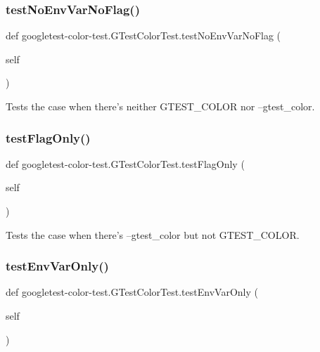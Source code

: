 \subsubsection{\texorpdfstring{test\+No\+Env\+Var\+No\+Flag()}{testNoEnvVarNoFlag()}}
{\footnotesize\ttfamily def googletest-\/color-\/test.\+G\+Test\+Color\+Test.\+test\+No\+Env\+Var\+No\+Flag (\begin{DoxyParamCaption}\item[{}]{self }\end{DoxyParamCaption})}

\begin{DoxyVerb}Tests the case when there's neither GTEST_COLOR nor --gtest_color.\end{DoxyVerb}
 \mbox{\label{classgoogletest-color-test_1_1_g_test_color_test_ade41e99b5486c9d947d9b817210174f6}} 
\subsubsection{\texorpdfstring{test\+Flag\+Only()}{testFlagOnly()}}
{\footnotesize\ttfamily def googletest-\/color-\/test.\+G\+Test\+Color\+Test.\+test\+Flag\+Only (\begin{DoxyParamCaption}\item[{}]{self }\end{DoxyParamCaption})}

\begin{DoxyVerb}Tests the case when there's --gtest_color but not GTEST_COLOR.\end{DoxyVerb}
 \mbox{\label{classgoogletest-color-test_1_1_g_test_color_test_a1f0a2bab46c123e865a821307bd689de}} 
\subsubsection{\texorpdfstring{test\+Env\+Var\+Only()}{testEnvVarOnly()}}
{\footnotesize\ttfamily def googletest-\/color-\/test.\+G\+Test\+Color\+Test.\+test\+Env\+Var\+Only (\begin{DoxyParamCaption}\item[{}]{self }\end{DoxyParamCaption})}

